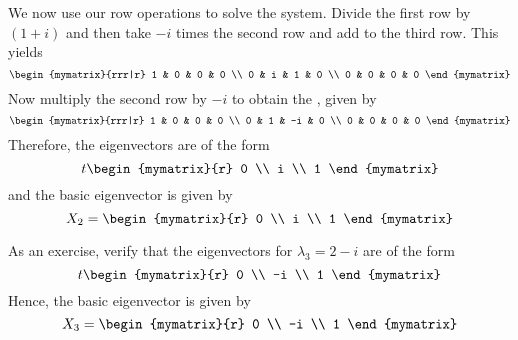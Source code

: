 \begin{solution}
We now use our row operations to solve the system.
Divide the first row by $(1+i) $ and then take 
$-i$ times the second row and add to the third row. This yields
\begin{equation*}
\begin{mymatrix}{rrr|r}
1 & 0 & 0 & 0 \\
0 & i & 1 & 0 \\
0 & 0 & 0 & 0
\end{mymatrix}
\end{equation*}
Now multiply the second row by $-i$ to obtain the {\rref}, given by 
\begin{equation*}
\begin{mymatrix}{rrr|r}
1 & 0 &  0 & 0 \\
0 & 1 & -i & 0 \\
0 & 0 &  0 & 0
\end{mymatrix}
\end{equation*}
Therefore, the eigenvectors are of the form
\begin{equation*}
t\begin{mymatrix}{r}
0 \\
i \\
1
\end{mymatrix} 
\end{equation*}
and the basic eigenvector is given by
\begin{equation*}
X_2 =
\begin{mymatrix}{r}
0 \\
i \\
1
\end{mymatrix}
\end{equation*}

As an exercise, verify that the eigenvectors for $\lambda_3 =2-i$ are of the form 
\begin{equation*}
t\begin{mymatrix}{r}
 0 \\
-i \\
 1
\end{mymatrix} 
\end{equation*}
Hence, the basic eigenvector is given by 
\begin{equation*}
X_3 = \begin{mymatrix}{r}
 0 \\
-i \\
 1
\end{mymatrix} 
\end{equation*}


\end{solution}
